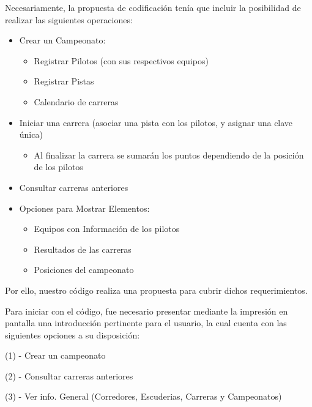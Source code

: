 \documentclass[12pt, letterpaper]{article} %
\begin{document}
Necesariamente, la propuesta de codificación tenía que incluir la posibilidad de realizar las siguientes operaciones:
\vspace{5mm} 
\begin{itemize}
    \item Crear un Campeonato:
    \begin{itemize}
        \item Registrar Pilotos (con sus respectivos equipos)
        \item Registrar Pistas
        \item Calendario de carreras
    \end{itemize}
    
    \item Iniciar una carrera (asociar una pista con los pilotos, y asignar una clave única)
    \begin{itemize}
        \item Al finalizar la carrera se sumarán los puntos dependiendo de la posición de los pilotos
    \end{itemize}
    
    \item Consultar carreras anteriores

    \item Opciones para Mostrar Elementos:
    \begin{itemize}
        \item Equipos con Información de los pilotos
        \item Resultados de las carreras
        \item Posiciones del campeonato
    \end{itemize}  
\end{itemize}
Por ello, nuestro código realiza una propuesta para cubrir dichos requerimientos.
\vspace{5mm}

Para iniciar con el código, fue necesario presentar mediante la impresión en pantalla una introducción pertinente para el usuario, la cual cuenta con las siguientes opciones a su disposición:
\vspace{5mm}

(1) - Crear un campeonato
\vspace{10mm} 

(2) - Consultar carreras anteriores
\vspace{10mm} 

(3) - Ver info. General (Corredores, Escuderias, Carreras y Campeonatos)
\vspace{10mm} 
\end{document}
